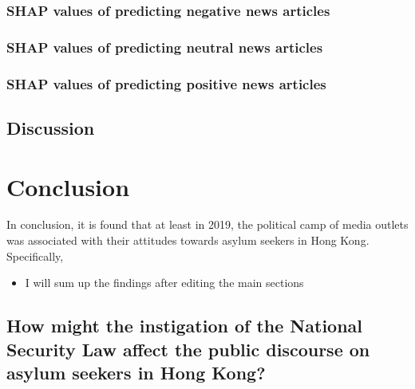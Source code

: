 \documentclass[a4paper, oneside]{report}
\providecommand{\tightlist}{%
  \setlength{\itemsep}{0pt}\setlength{\parskip}{0pt}}
\begin{document}
\hypertarget{shap-values-of-predicting-negative-news-articles}{%
\subsection{SHAP values of predicting negative news
articles}\label{shap-values-of-predicting-negative-news-articles}}

\hypertarget{shap-values-of-predicting-neutral-news-articles}{%
\subsection{SHAP values of predicting neutral news
articles}\label{shap-values-of-predicting-neutral-news-articles}}

\hypertarget{shap-values-of-predicting-positive-news-articles}{%
\subsection{SHAP values of predicting positive news
articles}\label{shap-values-of-predicting-positive-news-articles}}

\hypertarget{discussion}{%
\section{Discussion}\label{discussion}}

\setcounter{chapter}{4}

\hypertarget{conclusion}{%
\chapter{Conclusion}\label{conclusion}}

In conclusion, it is found that at least in 2019, the political camp of
media outlets was associated with their attitudes towards asylum seekers
in Hong Kong. Specifically,

\begin{itemize}
\tightlist
\item
  I will sum up the findings after editing the main sections
\end{itemize}

\hypertarget{how-might-the-instigation-of-the-national-security-law-affect-the-public-discourse-on-asylum-seekers-in-hong-kong}{%
\section{How might the instigation of the National Security Law affect
the public discourse on asylum seekers in Hong
Kong?}\label{how-might-the-instigation-of-the-national-security-law-affect-the-public-discourse-on-asylum-seekers-in-hong-kong}}
\end{document}
